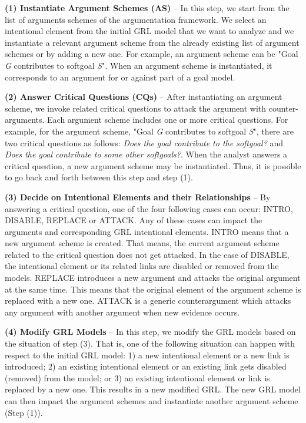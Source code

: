 \textbf{(1) Instantiate Argument Schemes (AS)} -- In this step, we start from the list of arguments schemes of the argumentation framework. We select an intentional element from the initial GRL model that we want to analyze and we instantiate a relevant argument scheme from the already existing list of argument schemes or by adding a new one. For example, an argument scheme can be "Goal \emph{G} contributes to softgoal \emph{S}". When an argument scheme is instantiated, it corresponds to  an argument for or against part of a goal model.

\textbf{(2) Answer Critical Questions (CQs)} -- After instantiating an argument scheme, we invoke related critical questions to attack the argument with counter-arguments.  Each argument scheme includes one or more critical questions. For example, for the argument scheme, "Goal \emph{G} contributes to softgoal \emph{S}", there are two critical questions as follows:  \emph{Does the goal contribute to the softgoal?} and \emph{Does the goal contribute to some other softgoals?}. 
When the analyst answers  a critical question, a new argument scheme may be instantiated.  Thus, it is possible to go back and forth between this step and step (1).

\textbf{(3) Decide on Intentional Elements and their Relationships} -- By answering a critical question, one of the four following cases can occur: \textsf{INTRO}, \textsf{DISABLE}, \textsf{REPLACE} or \textsf{ATTACK}.  Any of these cases can  impact the arguments and corresponding GRL intentional elements.  \textsf{INTRO} means that 
a new argument scheme is created. That means, the current argument scheme related to the critical question does not get attacked.  In the case of \textsf{DISABLE}, the intentional element or its related links are disabled or removed from the models. \textsf{REPLACE} introduces a new argument and attacks the original argument at the same time. This means that the original element of the argument scheme is replaced with a new one. \textsf{ATTACK} is a generic counterargument which attacks any argument with another argument when new evidence occurs.  

\textbf{(4) Modify GRL Models} -- In this step, we modify the GRL models based on the situation of step (3). That is, one of the following situation can happen with respect to the initial GRL model: 1) a new intentional element or a new link is introduced; 2) an existing intentional element or an existing link gets disabled (removed) from the model; or 3) an existing intentional element or link is replaced by a new one. This results in a new modified GRL. The new GRL model can then impact the argument schemes and instantiate another argument scheme (Step (1)).   

